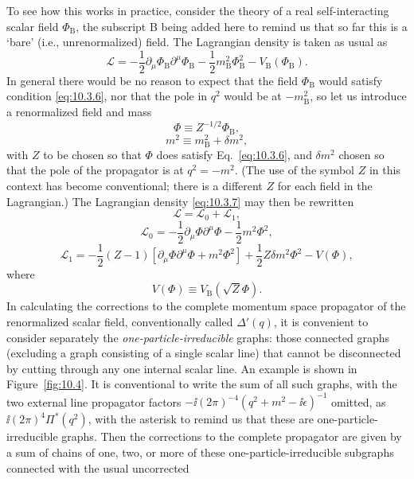 To see how this works in practice, consider the theory of a real
self-interacting scalar field $\Phi_{\mathrm B}$, the subscript B being added
here to remind us that so far this is a `bare' (i.e., unrenormalized) field. The
Lagrangian density is taken as usual as
\begin{equation}
\mathcal L=-\frac12\partial_\mu\Phi_{\mathrm B}\partial^\mu\Phi_{\mathrm B}
-\frac12m_{\mathrm B}^2\Phi_{\mathrm B}^2-V_{\mathrm B}(\Phi_{\mathrm B}).
\tag{10.3.7}\label{eq:10.3.7}
\end{equation}
In general there would be no reason to expect that the field
$\Phi_{\mathrm B}$ would satisfy condition \eqref{eq:10.3.6}, nor that the pole
in $q^2$ would be at $-m_{\mathrm B}^2$, so let us introduce a renormalized
field and mass
\begin{equation}
\Phi\equiv Z^{-1/2}\Phi_{\mathrm B},
\tag{10.3.8}\label{eq:10.3.8}
\end{equation}
\begin{equation}
m^2\equiv m_{\mathrm B}^2+\delta m^2,
\tag{10.3.9}\label{eq:10.3.9}
\end{equation}
with $Z$ to be chosen so that $\Phi$ does satisfy Eq.~\eqref{eq:10.3.6}, and
$\delta m^2$ chosen so that the pole of the propagator is at $q^2=-m^2$. (The
use of the symbol $Z$ in this context has become conventional; there is a
different $Z$ for each field in the Lagrangian.) The Lagrangian density
\eqref{eq:10.3.7} may then be rewritten
\begin{equation}
\mathcal L=\mathcal L_0+\mathcal L_1,
\tag{10.3.10}\label{eq:10.3.10}
\end{equation}
\begin{equation}
\mathcal L_0=-\frac12\partial_\mu\Phi\partial^\mu\Phi-\frac12m^2\Phi^2,
\tag{10.3.11}\label{eq:10.3.11}
\end{equation}
\begin{equation}
\mathcal L_1=-\frac12(Z-1)
[\partial_\mu\Phi\partial^\mu\Phi+m^2\Phi^2]
+\frac12Z\delta m^2\Phi^2-V(\Phi),
\tag{10.3.12}\label{eq:10.3.12}
\end{equation}
where
\[
V(\Phi)\equiv V_{\mathrm B}(\sqrt Z\Phi).
\]
In calculating the corrections to the complete momentum space propagator of
the renormalized scalar field, conventionally called $\Delta'(q)$, it is
convenient to consider separately the \emph{one-particle-irreducible} graphs:
those connected graphs (excluding a graph consisting of a single scalar line)
that cannot be disconnected by cutting through any one internal scalar line.
An example is shown in Figure~\ref{fig:10.4}. It is conventional to write the
sum of all such graphs, with the two external line propagator factors
$-\ii(2\pi)^{-4}(q^2+m^2-\ii\epsilon)^{-1}$ omitted, as
$\ii(2\pi)^4\Pi^*(q^2)$, with the asterisk to remind us that these are
one-particle-irreducible graphs. Then the corrections to the complete
propagator are given by a sum of chains of one, two, or more of these
one-particle-irreducible subgraphs connected with the usual uncorrected

